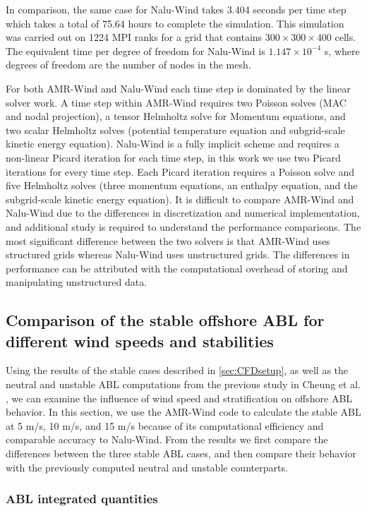 In comparison, the same case for Nalu-Wind takes 3.404 seconds per time step which
takes a total of 75.64 hours to complete the simulation. This simulation was carried out
on 1224 MPI ranks for a grid that contains $300\times 300 \times 400$ cells. The equivalent
time per degree of freedom for Nalu-Wind is $1.147 \times 10^{-4}$ s, where degrees of freedom
are the number of nodes in the mesh. 

For both AMR-Wind and Nalu-Wind each time step is dominated by the linear solver work. 
A time step within AMR-Wind requires two Poisson solves (MAC and nodal projection),
a tensor Helmholtz solve for Momentum equations, and two scalar Helmholtz solves 
(potential temperature equation and subgrid-scale kinetic energy equation).
Nalu-Wind is a fully implicit scheme and requires a non-linear Picard iteration for each time
step, in this work we use two Picard iterations for every time step.
Each Picard iteration requires a Poisson solve and five Helmholtz solves
(three momentum equations, an enthalpy equation, and the subgrid-scale kinetic energy equation).
It is difficult to compare AMR-Wind and Nalu-Wind due to the differences in discretization and numerical
implementation, and additional study is required to understand the performance comparisons.
The most significant difference between the two solvers is that AMR-Wind uses structured grids
whereas Nalu-Wind uses unstructured grids. The differences in performance can be attributed with the 
computational overhead of storing and manipulating unstructured data.  


\subsection{Comparison of the stable offshore ABL for different wind speeds and stabilities}

Using the results of the stable cases described in \ref{sec:CFDsetup},
as well as the neutral and unstable ABL computations from the previous
study in Cheung et al. \cite{cheung2020large}, we can examine the
influence of wind speed and stratification on offshore ABL behavior.
In this section, we use the AMR-Wind code to calculate the stable ABL
at 5 m/s, 10 m/s, and 15 m/s because of its computational efficiency
and comparable accuracy to Nalu-Wind.  From the results we first
compare the differences between the three stable ABL cases, and then
compare their behavior with the previously computed neutral and
unstable counterparts.

\subsubsection{\label{sec:stableABLStats} ABL integrated quantities}

